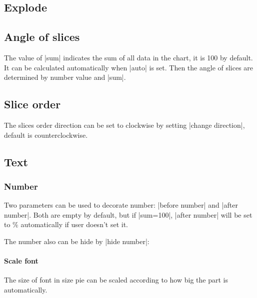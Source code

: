 \documentclass{ltxdoc}
\begin{document}
\codeexample[scale=0.4,from file={demo/color.tex}]

\subsection{Explode}
\codeexample[scale=0.4,from file={demo/explode.tex}]

\subsection{Angle of slices}
The value of |sum| indicates the sum of all data in the chart,
it is 100 by default. It can be calculated automatically when
|auto| is set. Then the angle of slices are determined by
number value and |sum|.

\codeexample[scale=0.4,from file={demo/sum.tex}]

\subsection{Slice order}
The slices order direction can be set to clockwise by setting |change direction|, default is counterclockwise.

\codeexample[scale=0.4,from file={demo/change-direction.tex}]

\subsection{Text}

\subsubsection{Number}
Two parameters can be used to decorate number: |before number|
and |after number|. Both are empty by default, but if
|sum=100|, |after number| will be set to \%
automatically if user doesn't set it.

\codeexample[scale=0.25,from file={demo/before-after-number.tex}]

The number also can be hide by |hide number|:

\codeexample[scale=0.25,from file={demo/hide-number.tex}]

\paragraph{Scale font}
The size of font in size pie can be scaled according to how big the
part is automatically.

\codeexample[scale=0.25,from file={demo/scalefont.tex}]
\end{document}
